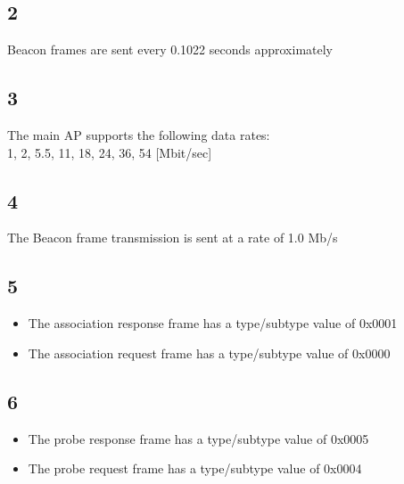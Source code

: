 \documentclass{article}
\begin{document}
    \subsection*{2}
        Beacon frames are sent every 0.1022 seconds approximately
    \subsection*{3}
        The main AP supports the following data rates:\\
        1, 2, 5.5, 11, 18, 24, 36, 54 [Mbit/sec]
    \subsection*{4}
        The Beacon frame transmission is sent at a rate of 1.0 Mb/s
    \subsection*{5}
        \begin{itemize}
            \item The association response frame has a type/subtype value of 0x0001
            \item The association request frame has a type/subtype value of 0x0000
        \end{itemize}
    \subsection*{6}
        \begin{itemize}
            \item The probe response frame has a type/subtype value of 0x0005
            \item The probe request frame has a type/subtype value of 0x0004
        \end{itemize}
\end{document}
